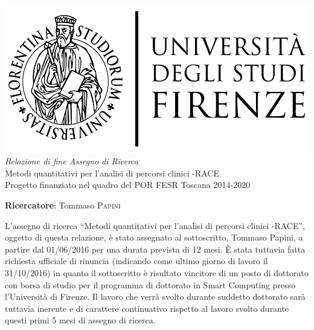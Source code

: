 \documentclass{article}
\begin{document}
    
    \begin{center}
        \includegraphics[scale=0.2]{logo_unifi.jpg}\\[4cm]
        \textit{Relazione di fine Assegno di Ricerca}\\[0.3cm]
        {\Huge Metodi quantitativi per l'analisi di percorsi clinici -RACE}\\[0.2cm]
        Progetto finanziato nel quadro del POR FESR Toscana 2014-2020
    \end{center}
    
    \vfill
    
    \textbf{Ricercatore}: Tommaso \textsc{Papini}
    
    \clearpage
    
    L'assegno di ricerca ``Metodi quantitativi per l'analisi di percorsi clinici -RACE'', oggetto di questa relazione, è stato assegnato al sottoscritto, Tommaso Papini, a partire dal 01/06/2016 per una durata prevista di 12 mesi. È stata tuttavia fatta richiesta ufficiale di rinuncia (indicando come ultimo giorno di lavoro il 31/10/2016) in quanto il sottoscritto è risultato vincitore di un posto di dottorato con borsa di studio per il programma di dottorato in Smart Computing presso l'Università di Firenze. Il lavoro che verrà svolto durante suddetto dottorato sarà tuttavia inerente e di carattere continuativo rispetto al lavoro svolto durante questi primi 5 mesi di assegno di ricerca.
    
\end{document}
